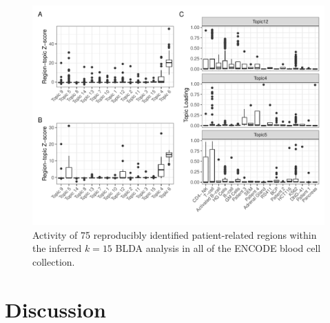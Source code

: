 \begin{figure}[]
    \centering
    \includegraphics[width=\textwidth]{plot/ch5/encode_pt_regions.pdf} 
    \caption{Activity of 75 reproducibly identified patient-related regions within the inferred $k=15$ BLDA analysis in all of the ENCODE blood cell collection.}
    \label{fig:encode_pt_regions_topics}
\end{figure}





\section{Discussion} \label{ch5:discussion}



